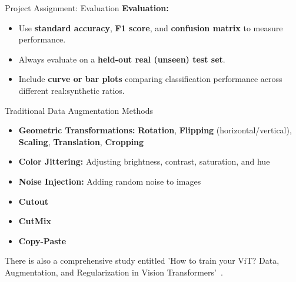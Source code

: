   \begin{refsection}
  \begin{frame}{Project Assignment: Evaluation}
    \textbf{Evaluation:}
    \begin{itemize}
      \item Use \textbf{standard accuracy}, \textbf{F1 score}, and \textbf{confusion matrix} to measure performance.
      \item Always evaluate on a \textbf{held-out real (unseen) test set}.
      \item Include \textbf{curve or bar plots} comparing classification performance across different real:synthetic ratios.
    \end{itemize}
    \bottomleftrefs
  \end{frame}
  \end{refsection}

\begin{refsection}
  \begin{frame}{Traditional Data Augmentation Methods}
    \begin{itemize}
      \item \textbf{Geometric Transformations:} \textbf{Rotation}, \textbf{Flipping} (horizontal/vertical), \textbf{Scaling}, \textbf{Translation}, \textbf{Cropping}
      \item \textbf{Color Jittering:} Adjusting brightness, contrast, saturation, and hue
      \item \textbf{Noise Injection:} Adding random noise to images
      \item \textbf{Cutout}~\parencite{devriesImprovedRegularizationConvolutional2017}
      \item \textbf{CutMix}~\parencite{yunCutMixRegularizationStrategy2019}
      \item \textbf{Copy-Paste}~\parencite{ghiasiSimpleCopyPasteStrong2021}
    \end{itemize}
    There is also a comprehensive study entitled 'How to train your ViT? Data, Augmentation,  and Regularization in Vision Transformers'~\parencite{steinerHowTrainYour2022}.
    \bottomleftrefs
  \end{frame}
\end{refsection}

